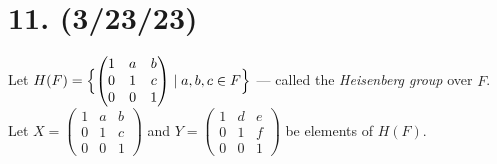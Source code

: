 \documentclass{article}
\begin{document}
\section*{11. (3/23/23)}

Let $H(F) = \Bigl\{ \begin{pmatrix}1 & a & b \\ 0 & 1 & c \\ 0 & 0 & 1\end{pmatrix} \mid a, b, c \in F \Bigr\}$ — called the \emph{Heisenberg group} over $F$. Let $X = \begin{pmatrix}1 & a & b \\ 0 & 1 & c \\ 0 & 0 & 1\end{pmatrix}$ and $Y = \begin{pmatrix}1 & d & e \\ 0 & 1 & f \\ 0 & 0 & 1\end{pmatrix}$ be elements of $H(F)$.
\end{document}
